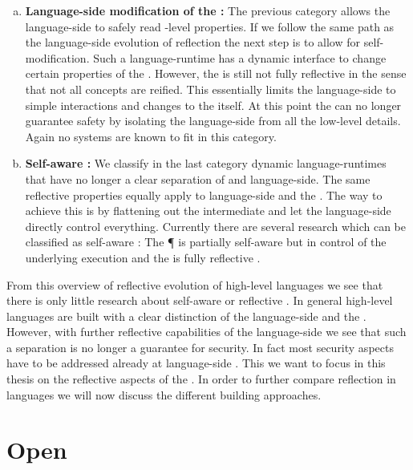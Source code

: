 \begin{enumerate}[a), nolistsep]
\item \textbf{Language-side modification of the \VM:}
	The previous category allows the language-side to safely read \VM-level properties.
	If we follow the same path as the language-side evolution of reflection the next step is to allow for self-modification.
	Such a language-runtime has a dynamic interface to change certain properties of the \VM.
	However, the \VM is still not fully reflective in the sense that not all \VM concepts are reified.
	This essentially limits the language-side to simple interactions and changes to the \VM itself.
	At this point the \VM can no longer guarantee safety by isolating the language-side from all the low-level details.
	Again no systems are known to fit in this category.
	
\item \textbf{Self-aware \VM:}
	We classify in the last category dynamic language-runtimes that have no longer a clear separation of \VM and language-side.
	The same reflective properties equally apply to language-side and the \VM.
	The way to achieve this is by flattening out the intermediate \VM and let the language-side directly control everything.
	Currently there are several research \VMs which can be classified as self-aware \VMs: The \P \VM \cite{Verw12a} is partially self-aware but in control of the underlying execution and the \Klein \VM is fully reflective \cite{Unga05a}. 
\end{enumerate}


\noindent From this overview of reflective evolution of high-level languages we see that there is only little research about self-aware \VMs or reflective \VMs.
In general high-level languages are built with a clear distinction of the language-side and the \VM.
However, with further reflective capabilities of the language-side we see that such a separation is no longer a guarantee for security.
In fact most security aspects have to be addressed already at language-side \cite{??}.
This we want to focus in this thesis on the reflective aspects of the \VM.
In order to further compare reflection in languages we will now discuss the different \VM building approaches. 

\section{Open \VMs}


